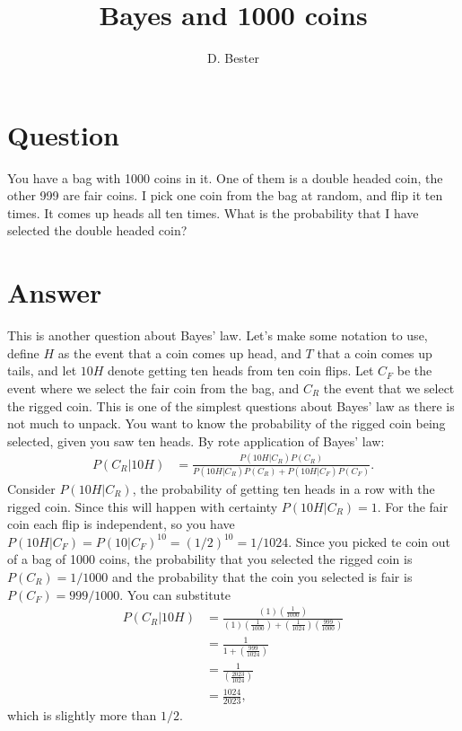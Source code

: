 \documentclass[11pt]{article}
\title{Bayes and 1000 coins}
\author{D. Bester}
\date{}
\begin{document}
\maketitle

\section{Question}

You have a bag with 1000 coins in it.
One of them is a double headed coin, the other 999 are fair coins.
I pick one coin from the bag at random, and flip it ten times.
It comes up heads all ten times.
What is the probability that I have selected the double headed coin?

\section{Answer}
This is another question about Bayes' law.
Let's make some notation to use, define
$H$ as the event that a coin comes up head, and $T$ that a coin comes up tails, and let $10H$ denote getting ten heads from ten coin flips.
Let $C_{F}$ be the event where we select the fair coin from the bag, and $C_{R}$ the event that we select the rigged coin.
This is one of the simplest questions about Bayes' law as there is not much to unpack.
You want to know the probability of the rigged coin being selected, given you saw ten heads.
By rote application of Bayes' law:
\begin{align}
\label{eq:1000coins:bayeslaw1}
 P( C_{R} \vert 10H)
 &=
 \frac{
    P( 10H \vert C_{R} )
    P( C_{R} )
 }{
    P( 10H \vert C_{R} )
    P( C_{R} )
    +
    P( 10H \vert C_{F} )
    P( C_{F} )
 }
 \text{.}
\end{align}
Consider
$P( 10H \vert C_{R} )$, the probability of getting ten heads in a row with the rigged coin.
Since this will happen with certainty
$P( 10H \vert C_{R} ) = 1$.
For the fair coin each flip is independent, so you have
$P( 10H \vert C_{F} )=P( 10 \vert C_{F} )^{10}= ({1}/{2})^{10} = {1}/{1024}$.
Since you picked te coin out of a bag of 1000 coins, the probability that you selected the rigged coin is
$P(C_{R}) = 1/1000$ and the probability that the coin you selected is fair is
$P(C_{F}) = 999/1000$.
You can substitute
\begin{align*}
 P( C_{R} \vert 10H)
 &=
 \frac{
    (1)
   \left( \frac{1}{1000} \right)
 }{
    (1)
   \left( \frac{1}{1000} \right)
    +
    \left(\frac{1}{1024}\right)
    \left(\frac{999}{1000}\right)
 }
 \\
 &=
 \frac{
    1
 }{
    1
    +
    \left(\frac{999}{1024}\right)
 }
 \\
 &=
 \frac{
    1
 }{
    \left(\frac{2023}{1024}\right)
 }
 \\
 &=
    \frac{1024}{2023}
 \text{,}
\end{align*}
which is slightly more than $1/2$.
\end{document}
